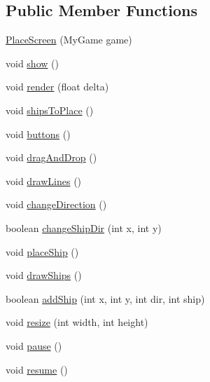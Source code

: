 \subsection*{Public Member Functions}
\begin{DoxyCompactItemize}
\item 
\hyperlink{classbattle_1_1gui_1_1_place_screen_af50b7a63f86d3fe98a199733d0475cc0}{Place\+Screen} (My\+Game game)
\item 
void \hyperlink{classbattle_1_1gui_1_1_place_screen_a54ef9bd149ff6e1401c6711921b3b3e9}{show} ()
\item 
void \hyperlink{classbattle_1_1gui_1_1_place_screen_ac35c9034250121006918020e6a7c96b1}{render} (float delta)
\item 
void \hyperlink{classbattle_1_1gui_1_1_place_screen_a053a65ba8e2041524610d5ef1700c8a7}{ships\+To\+Place} ()
\item 
void \hyperlink{classbattle_1_1gui_1_1_place_screen_ad080018b7f7660122c532661b97ec205}{buttons} ()
\item 
void \hyperlink{classbattle_1_1gui_1_1_place_screen_a816e01b0fd0110f0a0f737adc84ff436}{drag\+And\+Drop} ()
\item 
void \hyperlink{classbattle_1_1gui_1_1_place_screen_a6f60d7aba4ca9bb81d0cabe77460b0b6}{draw\+Lines} ()
\item 
void \hyperlink{classbattle_1_1gui_1_1_place_screen_af1eeaa112e3cab1e60b20c37e5459fa1}{change\+Direction} ()
\item 
boolean \hyperlink{classbattle_1_1gui_1_1_place_screen_a44a9ccb61d6f5fa5c610bdd8ad5f9190}{change\+Ship\+Dir} (int x, int y)
\item 
void \hyperlink{classbattle_1_1gui_1_1_place_screen_ab4eaa10b21505571566026549781f0ec}{place\+Ship} ()
\item 
void \hyperlink{classbattle_1_1gui_1_1_place_screen_a31b3369155be4505da34d4dd2e3334ad}{draw\+Ships} ()
\item 
boolean \hyperlink{classbattle_1_1gui_1_1_place_screen_afd879db15a69296f1c554faeb73d4393}{add\+Ship} (int x, int y, int dir, int ship)
\item 
void \hyperlink{classbattle_1_1gui_1_1_place_screen_a0b86f7d4a5db5ce9b69d7a2f7073e25e}{resize} (int width, int height)
\item 
void \hyperlink{classbattle_1_1gui_1_1_place_screen_a01dc84695d23aad2f7b7ba457180497d}{pause} ()
\item 
void \hyperlink{classbattle_1_1gui_1_1_place_screen_a0b827ed28a77839272361a2263ef2650}{resume} ()
\item 

\end{DoxyCompactItemize}
